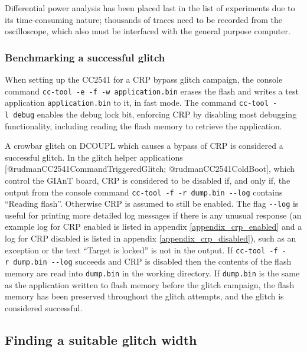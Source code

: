 Differential power analysis has been placed last in the list of
experiments due to its time-consuming nature; thousands of traces need
to be recorded from the oscilloscope, which also must be interfaced with
the general purpose computer.

\hypertarget{benchmarking-a-successful-glitch-1}{%
\subsubsection{Benchmarking a successful
glitch}\label{benchmarking-a-successful-glitch-1}}

When setting up the CC2541 for a CRP bypass glitch campaign, the console
command \texttt{cc-tool\ -e\ -f\ -w\ application.bin} erases the flash
and writes a test application \texttt{application.bin} to it, in fast
mode. The command \texttt{cc-tool\ -l\ debug} enables the debug lock
bit, enforcing CRP by disabling most debugging functionality, including
reading the flash memory to retrieve the application.

A crowbar glitch on DCOUPL which causes a bypass of CRP is considered a
successful glitch. In the glitch helper applications
{[}@rudmanCC2541CommandTriggeredGlitch; @rudmanCC2541ColdBoot{]}, which
control the GIAnT board, CRP is considered to be disabled if, and only
if, the output from the console command
\texttt{cc-tool\ -f\ -r\ dump.bin\ -\/-log} contains ``Reading flash''.
Otherwise CRP is assumed to still be enabled. The flag \texttt{-\/-log}
is useful for printing more detailed log messages if there is any
unusual response (an example log for CRP enabled is listed in appendix
\ref{appendix_crp_enabled} and a log for CRP disabled is listed in
appendix \ref{appendix_crp_disabled}), such as an exception or the text
``Target is locked'' is not in the output. If
\texttt{cc-tool\ -f\ -r\ dump.bin\ -\/-log} succeeds and CRP is disabled
then the contents of the flash memory are read into \texttt{dump.bin} in
the working directory. If \texttt{dump.bin} is the same as the
application written to flash memory before the glitch campaign, the
flash memory has been preserved throughout the glitch attempts, and the
glitch is considered successful.

\hypertarget{finding-a-suitable-glitch-width-1}{%
\subsection{\texorpdfstring{Finding a suitable glitch
width\label{section_cc2541_suitable_width}}{Finding a suitable glitch width}}\label{finding-a-suitable-glitch-width-1}}


